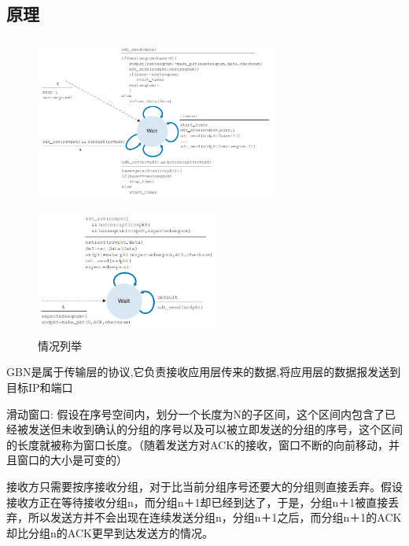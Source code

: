 \documentclass[UTF8,14pt]{article}
\numberwithin{figure}{section}
\begin{document}
\subsection{原理}
\vspace{-0.5cm}
\begin{figure}[!htbp]
      \centering
      \begin{minipage}[!ht]{0.59\textwidth}
            \centering
            \includegraphics[width=8cm,height=5.5cm]{figures/gbn1.png}
      \end{minipage}
      \begin{minipage}[!ht]{0.39\textwidth}
            \centering
            \includegraphics[width=6cm,height=4.3cm]{figures/gbn2.png}
      \end{minipage}
      \caption{情况列举}
\end{figure}

GBN是属于传输层的协议,它负责接收应用层传来的数据,将应用层的数据报发送到目标IP和端口

滑动窗口: 假设在序号空间内，划分一个长度为N的子区间，这个区间内包含了已经被发送但未收到确认的分组的序号以及可以被立即发送的分组的序号，这个区间的长度就被称为窗口长度。（随着发送方对ACK的接收，窗口不断的向前移动，并且窗口的大小是可变的）

接收方只需要按序接收分组，对于比当前分组序号还要大的分组则直接丢弃。假设接收方正在等待接收分组n，而分组n＋1却已经到达了，于是，分组n＋1被直接丢弃，所以发送方并不会出现在连续发送分组n，分组n＋1之后，而分组n＋1的ACK却比分组n的ACK更早到达发送方的情况。
\end{document}
